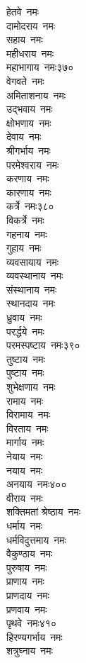 \begin{multicols}{2}
\begin{flushleft}
हेतवे~नमः\\
दामोदराय~नमः\\
सहाय~नमः\\
महीधराय~नमः\\
महाभागाय~नमः\hfill ३७०\\
वेगवते~नमः\\
अमिताशनाय~नमः\\
उद्भवाय~नमः\\
क्षोभणाय~नमः\\
देवाय~नमः\\
श्रीगर्भाय~नमः\\
परमेश्वराय~नमः\\
करणाय~नमः\\
कारणाय~नमः\\
कर्त्रे~नमः\hfill ३८०\\
विकर्त्रे~नमः\\
गहनाय~नमः\\
गुहाय~नमः\\
व्यवसायाय~नमः\\
व्यवस्थानाय~नमः\\
संस्थानाय~नमः\\
स्थानदाय~नमः\\
ध्रुवाय~नमः\\
परर्द्धये~नमः\\
परमस्पष्टाय~नमः\hfill ३९०\\
तुष्टाय~नमः\\
पुष्टाय~नमः\\
शुभेक्षणाय~नमः\\
रामाय~नमः\\
विरामाय~नमः\\
विरताय~नमः\\
मार्गाय~नमः\\
नेयाय~नमः\\
नयाय~नमः\\
अनयाय~नमः\hfill ४००\\
वीराय~नमः\\
शक्तिमतां श्रेष्ठाय~नमः\\
धर्माय~नमः\\
धर्मविदुत्तमाय~नमः\\
वैकुण्ठाय~नमः\\
पुरुषाय~नमः\\
प्राणाय~नमः\\
प्राणदाय~नमः\\
प्रणवाय~नमः\\
पृथवे~नमः\hfill ४१०\\
हिरण्यगर्भाय~नमः\\
शत्रुघ्नाय~नमः\\

\end{flushleft}
\end{multicols}
